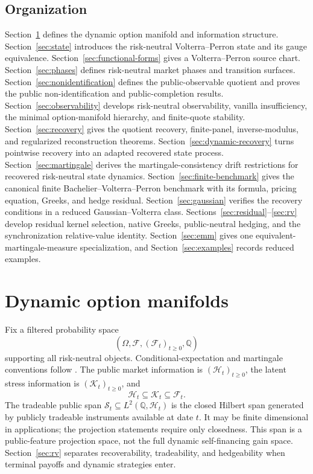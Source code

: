 \documentclass[11pt,a4paper]{amsart}
\theoremstyle{plain}
\theoremstyle{definition}
\theoremstyle{remark}
\newcommand{\QQ}{\mathbb{Q}}
\newcommand{\cF}{\mathcal{F}}
\newcommand{\cH}{\mathcal{H}}
\newcommand{\cK}{\mathcal{K}}
\newcommand{\cS}{\mathcal{S}}
\begin{document}
\subsection*{Organization}
Section~\ref{sec:manifold} defines the dynamic option manifold and information structure.
Section~\ref{sec:state} introduces the risk-neutral Volterra--Perron state and its gauge
equivalence.  Section~\ref{sec:functional-forms} gives a Volterra--Perron source chart.
Section~\ref{sec:phases} defines risk-neutral market phases and transition surfaces.
Section~\ref{sec:nonidentification} defines the public-observable quotient and proves the public
non-identification and public-completion results.
Section~\ref{sec:observability} develops risk-neutral observability, vanilla insufficiency, the
minimal option-manifold hierarchy, and finite-quote stability.  Section~\ref{sec:recovery} gives
the quotient recovery, finite-panel, inverse-modulus, and regularized reconstruction theorems.
Section~\ref{sec:dynamic-recovery} turns pointwise recovery into an adapted recovered state
process.  Section~\ref{sec:martingale}
derives the martingale-consistency drift restrictions for recovered risk-neutral state dynamics.
Section~\ref{sec:finite-benchmark} gives the canonical finite Bachelier--Volterra--Perron
benchmark with its formula, pricing equation, Greeks, and hedge residual.
Section~\ref{sec:gaussian} verifies the recovery conditions in a reduced Gaussian--Volterra
class.  Sections~\ref{sec:residual}--\ref{sec:rv} develop residual kernel selection, native Greeks,
public-neutral hedging, and the synchronization relative-value identity.
Section~\ref{sec:emm} gives one equivalent-martingale-measure specialization, and
Section~\ref{sec:examples} records reduced examples.

\section{Dynamic option manifolds}\label{sec:manifold}

Fix a filtered probability space
\[
        (\Omega,\cF,(\cF_t)_{t\ge0},\QQ)
\]
supporting all risk-neutral objects.  Conditional-expectation and martingale conventions follow
\cite{williams1991}.  The public market information is
\((\cH_t)_{t\ge0}\), the latent stress information is \((\cK_t)_{t\ge0}\), and
\[
        \cH_t\subseteq\cK_t\subseteq\cF_t.
\]
The tradeable public span \(\cS_t\subseteq L^2(\QQ,\cH_t)\) is the closed Hilbert span generated by
publicly tradeable instruments available at date \(t\).  It may be finite dimensional in
applications; the projection statements require only closedness.  This span is a public-feature
projection space, not the full dynamic self-financing gain space.  Section~\ref{sec:rv} separates
recoverability, tradeability, and hedgeability when terminal payoffs and dynamic strategies enter.
\end{document}
